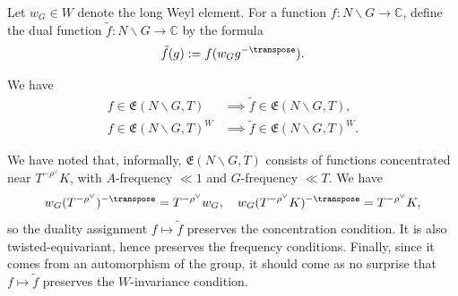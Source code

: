 \begin{definition}
  Let $w_G \in W$ denote the long Weyl element.  For a function $f : N \backslash G \rightarrow \mathbb{C}$, define the dual function $\tilde{f} : N \backslash G \rightarrow \mathbb{C}$ by the formula
  \begin{equation*}
    \tilde{f}(g) := f(w_G g^{-\transpose}).
  \end{equation*}
\end{definition}
\begin{lemma}\label{lem:standard:let-f-in}
  We have
  \begin{align*}
    f \in \mathfrak{E}(N \backslash G, T) &\implies \tilde{f} \in \mathfrak{E}(N \backslash G, T), \\
    f \in \mathfrak{E}(N \backslash G, T)^W &\implies \tilde{f} \in \mathfrak{E}(N \backslash G, T)^W.
  \end{align*}
\end{lemma}
\begin{remark}
  We have noted that, informally, $\mathfrak{E}(N \backslash G,T)$ consists of functions concentrated near $T^{-\rho^\vee} K$, with $A$-frequency $\ll 1$ and $G$-frequency $\ll T$.  We have
  \begin{equation*}
    w_G (T^{-\rho^\vee})^{-\transpose} = T^{-\rho^\vee} w_G,
    \quad
    w_G (T^{-\rho^\vee} K)^{-\transpose} = T^{-\rho^\vee} K,
  \end{equation*}
  so the duality assignment $f \mapsto \tilde{f}$ preserves the concentration condition.  It is also twisted-equivariant, hence preserves the frequency conditions.  Finally, since it comes from an automorphism of the group, it should come as no surprise  that $f \mapsto \tilde{f}$ preserves the $W$-invariance condition.
\end{remark}
